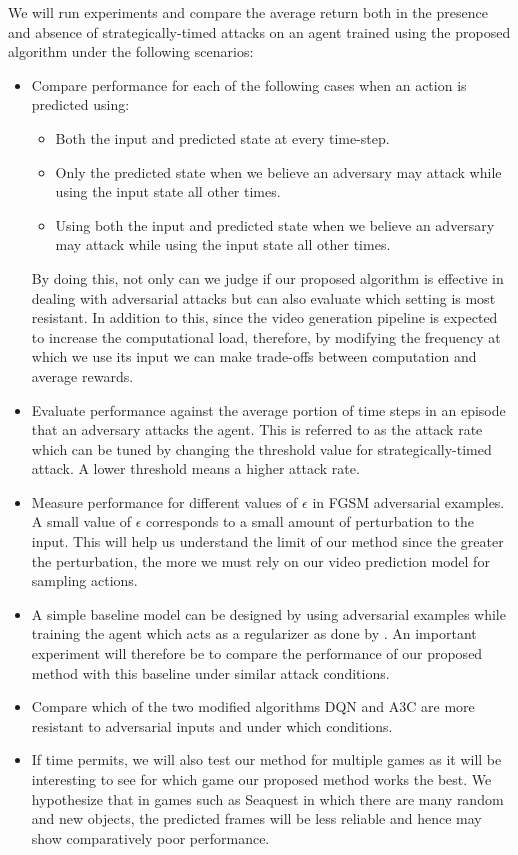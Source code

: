 We will run experiments and compare the average return both in the presence and absence of strategically-timed attacks on an agent trained using the proposed algorithm under the following scenarios:
\begin{itemize}
\item  Compare performance for each of the following cases when an action is predicted using: 
\begin{itemize}
\item Both the input and predicted state at every time-step.
\item Only the predicted state when we believe an adversary may attack while using the input state all other times.
\item Using both the input and predicted state when we believe an adversary may attack while using the input state all other times.  
\end{itemize}
By doing this, not only can we judge if our proposed algorithm is effective in dealing with adversarial attacks but can also evaluate which setting is most resistant. In addition to this, since the video generation pipeline is expected to increase the computational load, therefore, by modifying the frequency at which we use its input we can make trade-offs between computation and average rewards.
\item Evaluate performance against the average portion of time steps in an episode that an adversary attacks the agent. This is referred to as the attack rate which can be tuned by changing the threshold value for strategically-timed attack. A lower threshold means a higher attack rate. 
\item Measure performance for different values of $\epsilon$ in FGSM adversarial examples. A small value of $\epsilon$ corresponds to a small amount of perturbation to the input. This will help us understand the limit of our method since the greater the perturbation, the more we must rely on our video prediction model for sampling actions.
\item A simple baseline model can be designed by using adversarial examples while training the agent which acts as a regularizer as done by \cite{nineteen}. An important experiment will therefore be to compare the performance of our proposed method with this baseline under similar attack conditions. 
\item Compare which of the two modified algorithms DQN and A3C are more resistant to adversarial inputs and under which conditions. 
\item If time permits, we will also test our method for multiple games as it will be interesting to see for which game our proposed method works the best. We hypothesize that in games such as Seaquest in which there are many random and new objects, the predicted frames will be less reliable and hence may show comparatively poor performance. 
\end{itemize}


